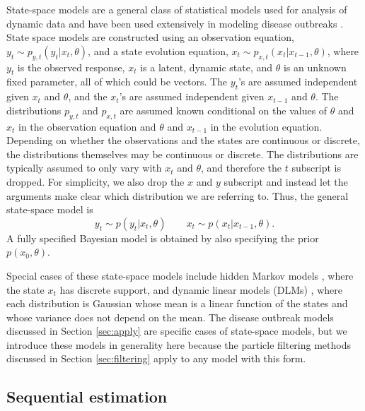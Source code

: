 \documentclass{elsarticle}
\begin{document}
State-space models are a general class of statistical models used for analysis of dynamic data and have been used extensively in modeling disease outbreaks \citep{Mart:Cone:Lope:Lope:baye:2008,watkins2009disease,merl2009statistical,ludkovski2010optimal,skvortsov2012monitoring}.  State space models are constructed using an observation equation, $y_t \sim p_{y,t}(y_t|x_t,\theta)$, and a state evolution equation, $x_t \sim p_{x,t}(x_t|x_{t-1},\theta)$, where $y_t$ is the observed response, $x_t$ is a latent, dynamic state, and $\theta$ is an unknown fixed parameter, all of which could be vectors. The $y_t$'s are assumed independent given $x_t$ and $\theta$, and the $x_t$'s are assumed independent given $x_{t-1}$ and $\theta$. The distributions $p_{y,t}$ and $p_{x,t}$ are assumed known conditional on the values of $\theta$ and $x_t$ in the observation equation and $\theta$ and $x_{t-1}$ in the evolution equation. Depending on whether the observations and the states are continuous or discrete, the distributions themselves may be continuous or discrete. The distributions are typically assumed to only vary with $x_t$ and $\theta$, and therefore the $t$ subscript is dropped. For simplicity, we also drop the $x$ and $y$ subscript and instead let the arguments make clear which distribution we are referring to. Thus, the general state-space model is
\[
y_t \sim p(y_t|x_t,\theta) \qquad
x_t \sim p(x_t|x_{t-1},\theta).
\]
A fully specified Bayesian model is obtained by also specifying the prior $p(x_0,\theta)$.

Special cases of these state-space models include hidden Markov models \citep{cappe2005inference,petris2009dynamic}, where the state $x_t$ has discrete support, and dynamic linear models (DLMs) \citep{West:Harr:baye:1997}, where each distribution is Gaussian whose mean is a linear function of the states and whose variance does not depend on the mean. The disease outbreak models discussed in Section \ref{sec:apply} are specific cases of state-space models, but we introduce these models in generality here because the particle filtering methods discussed in Section \ref{sec:filtering} apply to any model with this form.

\subsection{Sequential estimation \label {sec:sequential}}
\end{document}
